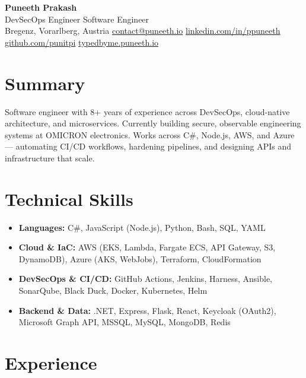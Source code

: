 \documentclass[a4paper,10pt]{article}
\begin{document}
\begin{center}
  {\huge\bfseries Puneeth Prakash}\\[0.28em]
  {\large DevSecOps Engineer \textbar{} Software Engineer}\\[0.3em]
  Bregenz, Vorarlberg, Austria \textbullet{}
  \href{mailto:contact@puneeth.io}{contact@puneeth.io} \textbullet{}
  \href{https://linkedin.com/in/ppuneeth}{linkedin.com/in/ppuneeth} \textbullet{}
  \href{https://github.com/punitpi}{github.com/punitpi} \textbullet{}
  \href{https://typedbyme.puneeth.io}{typedbyme.puneeth.io}
\end{center}

\section{Summary}
Software engineer with 8+ years of experience across DevSecOps, cloud-native architecture,
and microservices. Currently building secure, observable engineering systems at OMICRON
electronics. Works across C\#, Node.js, AWS, and Azure --- automating CI/CD workflows,
hardening pipelines, and designing APIs and infrastructure that scale.

\section{Technical Skills}
\begin{itemize}[leftmargin=0em,label={}]
  \item \textbf{Languages:} C\#, JavaScript (Node.js), Python, Bash, SQL, YAML
  \item \textbf{Cloud \& IaC:} AWS (EKS, Lambda, Fargate ECS, API Gateway, S3, DynamoDB), Azure (AKS, WebJobs), Terraform, CloudFormation
  \item \textbf{DevSecOps \& CI/CD:} GitHub Actions, Jenkins, Harness, Ansible, SonarQube, Black Duck, Docker, Kubernetes, Helm
  \item \textbf{Backend \& Data:} .NET, Express, Flask, React, Keycloak (OAuth2), Microsoft Graph API, MSSQL, MySQL, MongoDB, Redis
\end{itemize}

\section{Experience}
\end{document}
